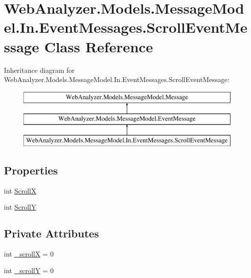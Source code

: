 \hypertarget{class_web_analyzer_1_1_models_1_1_message_model_1_1_in_1_1_event_messages_1_1_scroll_event_message}{}\section{Web\+Analyzer.\+Models.\+Message\+Model.\+In.\+Event\+Messages.\+Scroll\+Event\+Message Class Reference}
\label{class_web_analyzer_1_1_models_1_1_message_model_1_1_in_1_1_event_messages_1_1_scroll_event_message}
Inheritance diagram for Web\+Analyzer.\+Models.\+Message\+Model.\+In.\+Event\+Messages.\+Scroll\+Event\+Message\+:\begin{figure}[H]
\begin{center}
\leavevmode
\includegraphics[height=3.000000cm]{class_web_analyzer_1_1_models_1_1_message_model_1_1_in_1_1_event_messages_1_1_scroll_event_message}
\end{center}
\end{figure}
\subsection*{Properties}
\begin{DoxyCompactItemize}
\item 
int \hyperlink{class_web_analyzer_1_1_models_1_1_message_model_1_1_in_1_1_event_messages_1_1_scroll_event_message_a4cee20f8724b3bff5aeca63bc6f3ac83}{Scroll\+X}
\item 
int \hyperlink{class_web_analyzer_1_1_models_1_1_message_model_1_1_in_1_1_event_messages_1_1_scroll_event_message_ab7c3211d465e80a5d8f1cf40a0a690ff}{Scroll\+Y}
\end{DoxyCompactItemize}
\subsection*{Private Attributes}
\begin{DoxyCompactItemize}
\item 
int \hyperlink{class_web_analyzer_1_1_models_1_1_message_model_1_1_in_1_1_event_messages_1_1_scroll_event_message_ae26b23f9f8124d2315604c26b57d9514}{\+\_\+scroll\+X} = 0
\item 
int \hyperlink{class_web_analyzer_1_1_models_1_1_message_model_1_1_in_1_1_event_messages_1_1_scroll_event_message_aade3c2463574ef75166f23304ca467a1}{\+\_\+scroll\+Y} = 0
\end{DoxyCompactItemize}
